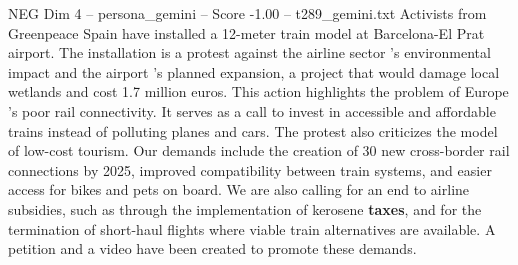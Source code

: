 \begin{textsample}{NEG Dim 4 – persona\_gemini – Score -1.00 – t289\_gemini.txt}  \label{ex:f4_neg_010}
Activists from Greenpeace Spain have installed a 12-meter train model at Barcelona-El Prat airport.
The installation is a protest against the airline sector 's environmental impact and the airport 's planned expansion, a project that would damage local wetlands and cost 1.7 million euros.
This action highlights the problem of Europe 's poor rail connectivity.
It serves as a call to invest in accessible and affordable trains instead of polluting planes and cars.
The protest also criticizes the model of low-cost tourism.
Our demands include the creation of 30 new cross-border rail connections by 2025, improved compatibility between train systems, and easier access for bikes and pets on board.
We are also calling for an end to airline subsidies, such as through the implementation of kerosene \textbf{taxes}, and for the termination of short-haul flights where viable train alternatives are available.
A petition and a video have been created to promote these demands.

\end{textsample}
